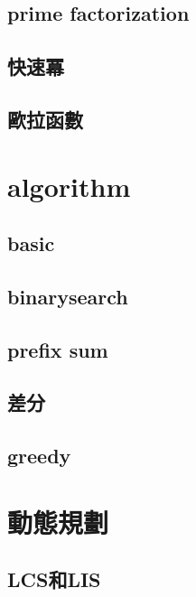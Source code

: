         \subsection{prime factorization}
                
        \subsection{快速冪}
            
        \subsection{歐拉函數}
            

\section{algorithm}
    \subsection{basic}
        
    \subsection{binarysearch}
        
    \subsection{prefix sum}
        
    \subsection{差分}
        
    \subsection{greedy}
        

        
\section{動態規劃}
    \subsection{LCS和LIS}
        



